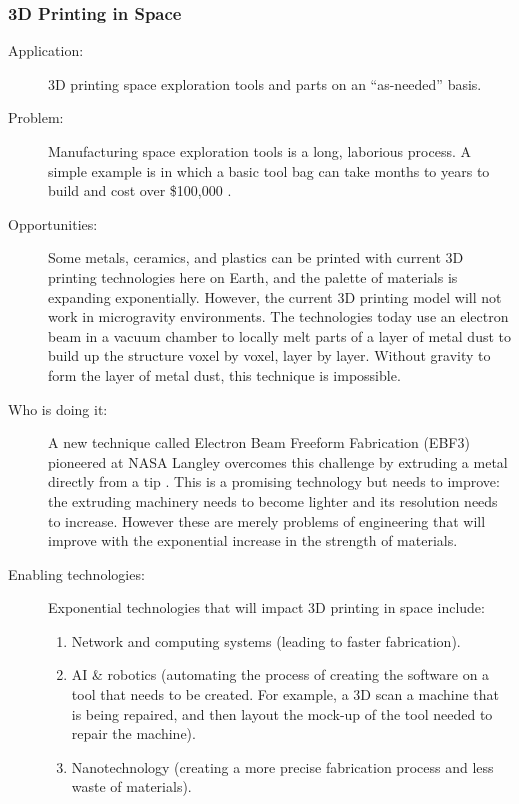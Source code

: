      \subsubsection{3D  Printing in Space} 
\begin{description}  \item[Application:] 
3D  printing space exploration tools and parts on an ``as-needed'' basis.
 
\item[Problem:] 
Manufacturing space exploration  tools is a long, laborious process. A simple example is in which a basic  tool bag can take months to years to build and cost over \$100,000 \cite{Bryner2008}.
 
\item[Opportunities:] 
Some metals, ceramics, and  plastics can be printed with current 3D printing technologies here on  Earth, and the palette of materials is expanding exponentially. However,  the current 3D printing model will not work in microgravity  environments. The technologies today use an electron beam in a vacuum  chamber to locally melt parts of a layer of metal dust to build up the  structure voxel by voxel, layer by layer. Without gravity to form the  layer of metal dust, this technique is impossible. 
 
\item[Who is doing it:] 
A new technique called Electron  Beam Freeform Fabrication (EBF3) pioneered at NASA Langley overcomes  this challenge by extruding a metal directly from a tip \cite{Dillow2009,TechnologyGateway2008,Banke2009}. This is a promising technology but needs to improve:  the extruding machinery needs to become lighter and its resolution needs  to increase. However these are merely problems of engineering that will  improve with the exponential increase in the strength of materials. 
 
\item[Enabling technologies:] 
Exponential technologies that will  impact 3D printing in space include: 
\hfill\begin{enumerate}
\item Network and computing  systems (leading to faster fabrication). 
\item AI \& robotics  (automating the process of creating the software on a tool that needs to  be created. For example, a 3D scan a machine that is being repaired,  and then layout the mock-up of the tool needed to repair the machine). 
\item Nanotechnology (creating a  more precise fabrication process and less waste of materials). 
\end{enumerate}
 

\end{description}
